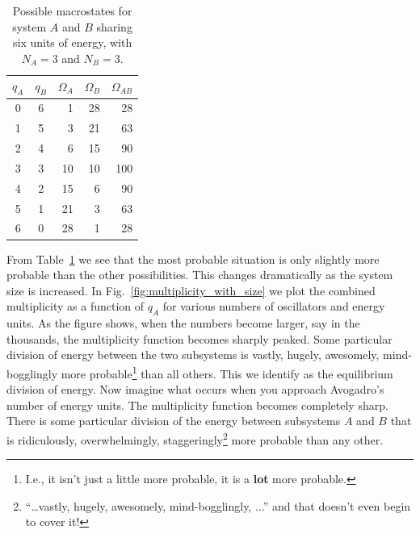 \begin{table}
\begin{center}
\begin{tabular}{ccrrr}
\hline\hline
$q_A$ & $q_B$ & \qquad $\Omega_A$ & $\Omega_B$ & \qquad $\Omega_{AB}$ \\
\hline
0 & 6 & 1 & 28 & 28 \\
1 & 5 & 3 & 21 & 63 \\
2 & 4 & 6 & 15 & 90 \\
3 & 3 & 10 & 10 & 100 \\
4 & 2 & 15 & 6 & 90 \\
5 & 1 & 21 & 3 & 63 \\
6 & 0 & 28 & 1 & 28 \\
\hline\hline 
\end{tabular}
\caption{Possible macrostates for system $A$ and $B$ sharing six units
  of energy, with $N_A=3$ and $N_B=3$.}
\label{table:two_systems}
\end{center}
\end{table}

From Table~\ref{table:two_systems} we see that the most probable
situation is only slightly more probable than the other possibilities.
This changes dramatically as the system size is increased.  In
Fig.~\ref{fig:multiplicity_with_size} we plot the combined
multiplicity as a function of $q_A$ for various numbers of oscillators
and energy units.  As the figure shows, when the numbers become
larger, say in the thousands, the multiplicity function becomes 
sharply peaked.  Some particular division of energy between
the two subsystems is vastly, hugely, awesomely, mind-bogglingly more
probable\footnote{I.e., it isn't just a little more probable, it is a
  {\bf lot} more probable.} than all others.  This we identify as the
equilibrium division of energy.  Now imagine what occurs when you
approach Avogadro's number of energy units.  The multiplicity function
becomes completely sharp.  There is some particular division of the
energy between subsystems $A$ and $B$ that is ridiculously, 
overwhelmingly, staggeringly\footnote{``\dots vastly, hugely,
  awesomely, mind-bogglingly, ...'' and that doesn't even begin to cover it!}
more probable than any other.

